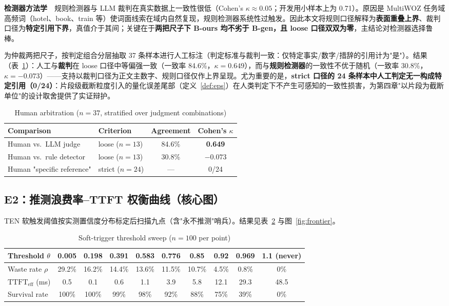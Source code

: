 \documentclass[conference]{IEEEtran}
\theoremstyle{definition}
\begin{document}
\textbf{检测器方法学}　规则检测器与 LLM 裁判在真实数据上一致性很低（Cohen's $\kappa\approx0.05$；开发用小样本上为 0.71）。原因是 MultiWOZ 任务域高频词（hotel、book、train 等）使词面线索在域内自然复现，规则检测器系统性过触发。因此本文将规则口径解释为\textbf{表面重叠上界}、裁判口径为\textbf{特定引用下界}，真值介于其间；关键在于\textbf{两把尺子下 B-ours 均不劣于 B-gen，且 loose 口径双双为零}，主结论对检测器选择鲁棒。

为仲裁两把尺子，按判定组合分层抽取 37 条样本进行人工标注（判定标准与裁判一致：仅特定事实/数字/措辞的引用计为"是"）。结果（表~\ref{tab:arbitration}）：人工与\textbf{裁判}在 loose 口径中等偏强一致（一致率 84.6\%，$\kappa=0.649$），而与\textbf{规则检测器}的一致性不优于随机（一致率 30.8\%，$\kappa=-0.073$）——支持以裁判口径为正文主数字、规则口径仅作上界呈现。尤为重要的是，\textbf{strict 口径的 24 条样本中人工判定无一构成特定引用（0/24）}：片段级截断粒度引入的量化误差尾部（定义~\ref{def:eps}）在人类判定下不产生可感知的一致性损害，为第四章"以片段为截断单位"的设计取舍提供了实证辩护。

\begin{table}[t]
\caption{Human arbitration ($n{=}37$, stratified over judgment combinations)}
\label{tab:arbitration}
\centering
\begin{tabular}{llcc}
\toprule
Comparison & Criterion & Agreement & Cohen's $\kappa$ \\
\midrule
Human vs.\ LLM judge & loose ($n{=}13$) & 84.6\% & \textbf{0.649} \\
Human vs.\ rule detector & loose ($n{=}13$) & 30.8\% & $-0.073$ \\
Human "specific reference" & strict ($n{=}24$) & --- & 0/24 \\
\bottomrule
\end{tabular}
\end{table}

\subsection{E2：推测浪费率–TTFT 权衡曲线（核心图）}\label{sec:e2}
TEN 软触发阈值按实测置信度分布标定后扫描九点（含"永不推测"哨兵）。结果见表~\ref{tab:sweep} 与图~\ref{fig:frontier}。

\begin{table}[t]
\caption{Soft-trigger threshold sweep ($n{=}100$ per point)}
\label{tab:sweep}
\centering
\begin{tabular}{lccccccccc}
\toprule
Threshold $\theta$ & 0.005 & 0.198 & 0.391 & 0.583 & 0.776 & 0.85 & 0.92 & 0.969 & 1.1 (never) \\
\midrule
Waste rate $\rho$ & 29.2\% & 16.2\% & 14.4\% & 13.6\% & 11.5\% & 10.7\% & 4.5\% & 0.8\% & 0\% \\
$\mathrm{TTFT}_{\text{eff}}$ (ms) & 0.5 & 0.1 & 0.6 & 1.1 & 3.9 & 5.8 & 12.1 & 29.3 & 48.5 \\
Survival rate & 100\% & 100\% & 99\% & 98\% & 92\% & 88\% & 75\% & 39\% & 0\% \\
\bottomrule
\end{tabular}
\end{table}
\end{document}
